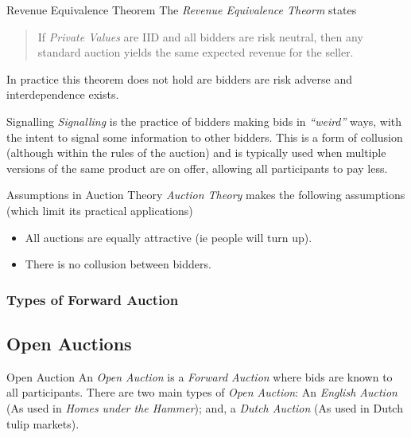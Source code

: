 \documentclass[11pt,a4paper]{article}
\begin{document}
  \begin{theorem}{Revenue Equivalence Theorem}
    The \textit{Revenue Equivalence Theorm} states
    \begin{quote}
      If \textit{Private Values} are IID and all bidders are risk neutral, then any standard auction yields the same expected revenue for the seller.
    \end{quote}
    In practice this theorem does not hold are bidders are risk adverse and interdependence exists.
  \end{theorem}

  \begin{definition}{Signalling}
    \textit{Signalling} is the practice of bidders making bids in \textit{``weird''} ways, with the intent to signal some information to other bidders. This is a form of collusion (although within the rules of the auction) and is typically used when multiple versions of the same product are on offer, allowing all participants to pay less.
  \end{definition}

  \begin{remark}{Assumptions in Auction Theory}
    \textit{Auction Theory} makes the following assumptions (which limit its practical applications)
    \begin{itemize}
      \item All auctions are equally attractive (ie people will turn up).
      \item There is no collusion between bidders.
    \end{itemize}
  \end{remark}

\subsubsection{Types of Forward Auction} \label{sec_TypesOfForwardAuction}

\subsection*{Open Auctions}

  \begin{definition}{Open Auction}
    An \textit{Open Auction} is a \textit{Forward Auction} where bids are known to all participants. There are two main types of \textit{Open Auction}: An \textit{English Auction} (As used in \textit{Homes under the Hammer}); and, a \textit{Dutch Auction} (As used in Dutch tulip markets).
  \end{definition}
\end{document}
